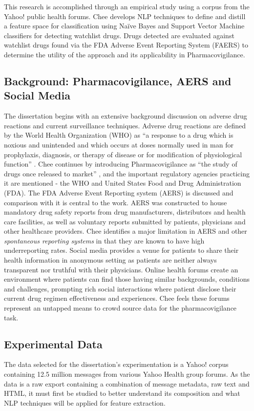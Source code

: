\documentclass[twoside,11pt]{article}
\begin{document}
This research is accomplished through an empirical study using a corpus from the
Yahoo! public health forums. Chee develops NLP techniques to define and distill a feature space for classification using Na\"ive Bayes and
Support Vector Machine classifiers for detecting watchlist drugs. Drugs detected are evaluated against watchlist drugs found via the FDA Adverse Event Reporting System (FAERS) to determine the utility of the approach and its applicability in Pharmacovigilance.

\subsection{Background: Pharmacovigilance, AERS and Social Media}
The dissertation begins with an extensive background discussion on adverse drug reactions and current surveillance techniques. Adverse drug reactions are defined by the World Health Organization (WHO) as ``a response to a drug which is noxious and unintended and which occurs at doses normally used in man for prophylaxis, diagnosis, or therapy of disease or for modification of physiological function'' \cite{WHO}. Chee continues by introducing Pharmacovigilance as ``the study of drugs once released to market'' \citep{Chee}, and the important regulatory agencies practicing it are mentioned - the WHO and United States Food and Drug Administration (FDA). The FDA Adverse Event Reporting system (AERS) is discussed and comparison with it is central to the work. AERS was constructed to house mandatory drug safety reports from drug manufacturers, distributors and health care facilities, as well as voluntary reports submitted by patients, physicians and other healthcare providers.
Chee identifies a major limitation in AERS and other \textit{spontaneous reporting systems} in that they are known to have high underreporting rates. Social media provides a venue for patients to share their health information in anonymous setting as patients are neither always transparent nor truthful with their physicians. Online health forums create an environment where patients can find those having similar backgrounds, conditions and challenges, prompting rich social interactions where patient disclose their current drug regimen effectiveness and experiences. Chee feels these forums represent an untapped means to crowd source data for the pharmacovigilance task.

\subsection{Experimental Data}
The data selected for the dissertation's experimentation is a Yahoo! corpus containing 12.5 million messages from various Yahoo Health group forums. As the data is a raw export containing a combination of message metadata, raw text and HTML, it must first be studied to better understand its composition and what NLP techniques will be applied for feature extraction.
\end{document}
